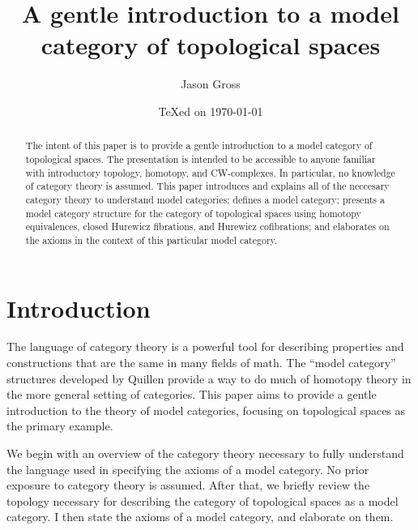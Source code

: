 \documentclass{amsart}
\theoremstyle{definition} \newaliasedtheorem{defn}[thm]{Definition}
\theoremstyle{definition} \newtheorem*{defn*}{Definition}
\theoremstyle{definition} \newaliasedtheorem{xca}[thm]{Exercise}
\theoremstyle{definition} \newtheorem*{soln*}{Solution}
\theoremstyle{definition} \newaliasedtheorem{remark}[thm]{Remark}
\theoremstyle{definition} \newtheorem*{remark*}{Remark}
\begin{document}
\title{A gentle introduction to a model category of topological spaces}
\author[J. Gross]{Jason Gross}
\address{Massachusetts Institute of Technology}
\date{\TeX ed on \today}

\begin{abstract}
  The intent of this paper is to provide a gentle introduction to a model category of topological spaces.  The presentation is intended to be accessible to anyone familiar with introductory topology, homotopy, and CW-complexes.  In particular, no knowledge of category theory is assumed.  This paper introduces and explains all of the neccesary category theory to understand model categories; defines a model category; presents a model category structure for the category of topological spaces using homotopy equivalences, closed Hurewicz fibrations, and Hurewicz cofibrations; and elaborates on the axioms in the context of this particular model category.
\end{abstract}

\maketitle

\section{Introduction}
  The language of category theory is a powerful tool for describing properties and constructions that are the same in many fields of math.  The ``model category'' structures developed by Quillen provide a way to do much of homotopy theory in the more general setting of categories.  This paper aims to provide a gentle introduction to the theory of model categories, focusing on topological spaces as the primary example.
  
  We begin with an overview of the category theory necessary to fully understand the language used in specifying the axioms of a model category.  No prior exposure to category theory is assumed.  After that, we briefly review the topology necessary for describing the category of topological spaces as a model category.  I then state the axioms of a model category, and elaborate on them.
  
\end{document}
